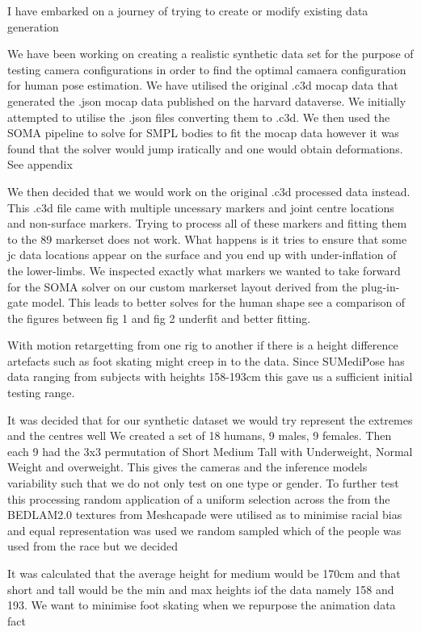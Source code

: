 I have embarked on a journey of trying to create or modify existing data generation 

We have been working on creating a realistic synthetic data set for the purpose of testing camera configurations in order to
find the optimal camaera configuration for human pose estimation. 
We have utilised the original .c3d mocap data that generated the .json mocap data published on the harvard dataverse. 
We initially attempted to utilise the .json files converting them to .c3d. We then used the SOMA pipeline to solve for SMPL bodies
to fit the mocap data however it was found that the solver would jump iratically and one would obtain deformations. See appendix

We then decided that we would work on the original .c3d processed data instead. This .c3d file came with multiple uncessary markers 
and joint centre locations and non-surface markers. Trying to process all of these markers and fitting them to the 89 markerset does not work.
What happens is it tries to ensure that some jc data locations appear on the surface and you end up with under-inflation of the lower-limbs.
We inspected exactly what markers we wanted to take forward for the SOMA solver on our custom markerset layout derived from the plug-in-gate model.
This leads to better solves for the human shape see a comparison of the figures between fig 1 and fig 2 underfit and better fitting.

With motion retargetting from one rig to another if there is a height difference artefacts such as foot skating might creep in to the data.
Since SUMediPose has data ranging from subjects with heights 158-193cm this gave us a sufficient initial testing range.

It was decided that for our synthetic dataset we would try represent the extremes and the centres well
We created a set of 18 humans, 9 males, 9 females. Then each 9 had the 3x3 permutation of Short Medium Tall with Underweight, Normal Weight and overweight.
This gives the cameras and the inference models variability such that we do not only test on one type or gender. To further 
test this processing random application of a uniform selection across the from the BEDLAM2.0 textures from Meshcapade were utilised as to minimise racial bias and equal 
representation was used we random sampled which of the people was used from the race but we decided

It was calculated that the average height for medium would be 170cm and that short and tall would be the min and max heights iof 
the data namely 158 and 193. We want to minimise foot skating when we repurpose the animation data fact

